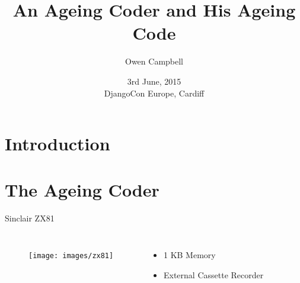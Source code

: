\documentclass{beamer}
\title{An Ageing Coder and His Ageing Code}
\author{Owen Campbell}
\date[DjangoCon Europe 2015]{3rd June, 2015\\DjangoCon Europe, Cardiff}
\begin{document}
\begin{frame}
  \titlepage{}
\end{frame}

\section{Introduction}

\section{The Ageing Coder}

  \begin{frame}{Sinclair ZX81}
    \begin{columns}
        \begin{figure}
          \texttt{[image: images/zx81]}
        \end{figure}
        \begin{itemize}
          \item 1 KB Memory
          \item External Cassette Recorder
        \end{itemize}
    \end{columns}
  \end{frame}
\end{document}
